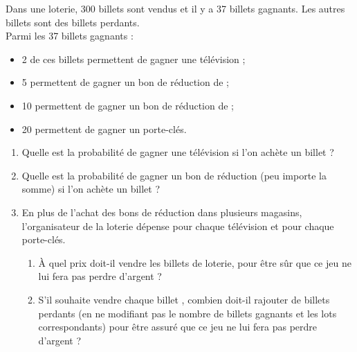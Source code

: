 \begin{exercice}[CRPE 2018 G1]
   Dans une loterie, 300 billets sont vendus et il y a 37 billets gagnants. Les autres billets sont des billets perdants. \\ [1mm]
   Parmi les 37 billets gagnants :
   \begin{itemize}
      \item 2 de ces billets permettent de gagner une télévision ;
      \item 5 permettent de gagner un bon de réduction de  ;
      \item 10 permettent de gagner un bon de réduction de  ;
      \item 20 permettent de gagner un porte-clés.
   \end{itemize}
   \begin{enumerate}
      \item Quelle est la probabilité de gagner une télévision si l’on achète un billet ?
      \item Quelle est la probabilité de gagner un bon de réduction (peu importe la somme) si l’on achète un billet ?
      \item En plus de l’achat des bons de réduction dans plusieurs magasins, l’organisateur de la loterie dépense  pour chaque télévision et  pour chaque porte-clés.
         \begin{enumerate}
            \item À quel prix doit-il vendre les billets de loterie, pour être sûr que ce jeu ne lui fera pas perdre d’argent ?
            \item S’il souhaite vendre chaque billet , combien doit-il rajouter de billets perdants (en ne modifiant pas le nombre de billets gagnants et les lots correspondants) pour être assuré que ce jeu ne lui fera pas perdre d’argent ?
         \end{enumerate}
   \end{enumerate}
\end{exercice}

